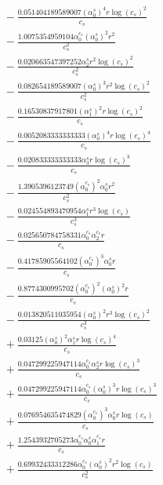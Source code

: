 \documentclass[10pt]{article}
\begin{document}
\begin{align*}
&{}  - \frac{0.051404189589007 \left(\alpha_{0}^s\right)^{4} r \log{\left(c_{s} \right)}^{2}}{c_{s}} \\
&{}  - \frac{1.0075354959104 \alpha_{0}^{c_s} \left(\alpha_{0}^s\right)^{2} r^{2}}{c_{s}^{2}} \\
&{}  - \frac{0.020663547397252 \alpha_{2}^s r^{2} \log{\left(c_{s} \right)}^{2}}{c_{s}^{2}} \\
&{}  - \frac{0.082654189589007 \left(\alpha_{0}^s\right)^{3} r^{2} \log{\left(c_{s} \right)}^{2}}{c_{s}^{2}} \\
&{}  - \frac{0.16530837917801 \left(\alpha_{1}^s\right)^{2} r \log{\left(c_{s} \right)}^{2}}{c_{s}} \\
&{}  - \frac{0.0052083333333333 \left(\alpha_{0}^s\right)^{4} r \log{\left(c_{s} \right)}^{4}}{c_{s}} \\
&{}  - \frac{0.020833333333333 \alpha_{3}^s r \log{\left(c_{s} \right)}^{3}}{c_{s}} \\
&{}  - \frac{1.3905396123749 \left(\alpha_{0}^{c_s}\right)^{2} \alpha_{0}^s r^{2}}{c_{s}^{2}} \\
&{}  - \frac{0.024554893470954 \alpha_{1}^s r^{3} \log{\left(c_{s} \right)}}{c_{s}^{3}} \\
&{}  - \frac{0.025650784758331 \alpha_{0}^{c_s} \alpha_{2}^{c_s} r}{c_{s}} \\
&{}  - \frac{0.41785905564102 \left(\alpha_{0}^{c_s}\right)^{3} \alpha_{0}^s r}{c_{s}} \\
&{}  - \frac{0.8774300995702 \left(\alpha_{0}^{c_s}\right)^{2} \left(\alpha_{0}^s\right)^{2} r}{c_{s}} \\
&{}  - \frac{0.013820511035954 \left(\alpha_{0}^s\right)^{2} r^{3} \log{\left(c_{s} \right)}^{2}}{c_{s}^{3}} \\
&{}  + \frac{0.03125 \left(\alpha_{0}^s\right)^{2} \alpha_{1}^s r \log{\left(c_{s} \right)}^{4}}{c_{s}} \\
&{}  + \frac{0.047299225947114 \alpha_{0}^{c_s} \alpha_{2}^s r \log{\left(c_{s} \right)}^{3}}{c_{s}} \\
&{}  + \frac{0.047299225947114 \alpha_{0}^{c_s} \left(\alpha_{0}^s\right)^{3} r \log{\left(c_{s} \right)}^{3}}{c_{s}} \\
&{}  + \frac{0.076954635474829 \left(\alpha_{0}^{c_s}\right)^{3} \alpha_{0}^s r \log{\left(c_{s} \right)}}{c_{s}} \\
&{}  + \frac{1.2543932705273 \alpha_{0}^{c_s} \alpha_{0}^s \alpha_{1}^{c_s} r}{c_{s}} \\
&{}  + \frac{0.69932433312286 \alpha_{0}^{c_s} \left(\alpha_{0}^s\right)^{2} r^{2} \log{\left(c_{s} \right)}}{c_{s}^{2}} \\

\end{align*}
\end{document}
